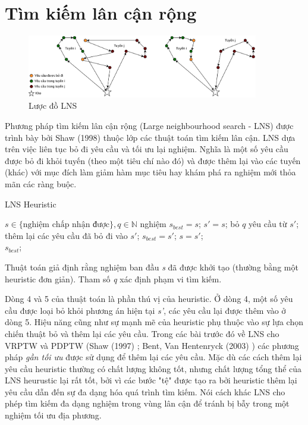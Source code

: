 \section{Tìm kiếm lân cận rộng}

\begin{figure}[H] %
  \centering %
  \includegraphics[width=0.9\textwidth]{figures/ALNS-paradim.png} 
  \caption{Lược đồ LNS} 
  \label{fig:lns_paradim}
\end{figure}

Phương pháp tìm kiếm lân cận rộng (Large neighbourhood search - LNS) được trình bày bởi Shaw (1998) \cite{shaw1998using} thuộc lớp các thuật toán tìm kiếm lân cận. LNS dựa trên việc liên tục bỏ đi yêu cầu và tối ưu lại nghiệm. Nghĩa là một số yêu cầu được bỏ đi khỏi tuyến (theo một tiêu chí nào đó) và được thêm lại vào các tuyến (khác) với mục đích làm giảm hàm mục tiêu hay khám phá ra nghiệm mới thỏa mãn các ràng buộc.

\begin{algorithm}
  \label{alg:lns}
	\caption{LNS Heuristic} 
	\begin{algorithmic}[1]
        \Require $s \in \text{\{nghiệm chấp nhận được\}}, q \in \mathbb{N}$
        \State nghiệm $s_{best} = s$;
				\Repeat
					\State $s'=s$;
					\State bỏ $q$ yêu cầu từ $s'$;
					\State thêm lại các yêu cầu đã bỏ đi vào $s'$;
						\State $s_{best} = s'$;
					\EndIf
						\State $s=s'$;
					\EndIf
				\\
				\Return $s_{best}$;
	\end{algorithmic} 
\end{algorithm}

Thuật toán giả định rằng nghiệm ban đầu \textit{s} đã được khởi tạo (thường bằng một heuristic đơn giản). Tham số \textit{q} xác định phạm vi tìm kiếm. 

Dòng 4 và 5 của thuật toán là phần thú vị của heuristic. Ở dòng 4, một số yêu cầu được loại bỏ khỏi phương án hiện tại \textit{s'}, các yêu cầu lại được thêm vào ở dòng 5. Hiệu năng cũng như sự mạnh mẽ của heuristic phụ thuộc vào sự lựa chọn chiến thuật bỏ và thêm lại các yêu cầu. Trong các bài trước đó về LNS cho VRPTW và PDPTW (Shaw (1997) \cite{shaw1997new}; Bent, Van Hentenryck (2003) \cite{bent2003two}) các phương pháp \textit{gần tối ưu} được sử dụng để thêm lại các yêu cầu. Mặc dù các cách thêm lại yêu cầu heuristic thường có chất lượng không tốt, nhưng chất lượng tổng thể của LNS heurustic lại rất tốt, bởi vì các bước "tệ" được tạo ra bởi heuristic thêm lại yêu cầu dẫn đến sự đa dạng hóa quá trình tìm kiếm. Nói cách khác LNS cho phép tìm kiếm đa dạng nghiệm trong vùng lân cận để tránh bị bẫy trong một nghiệm tối ưu địa phương.

